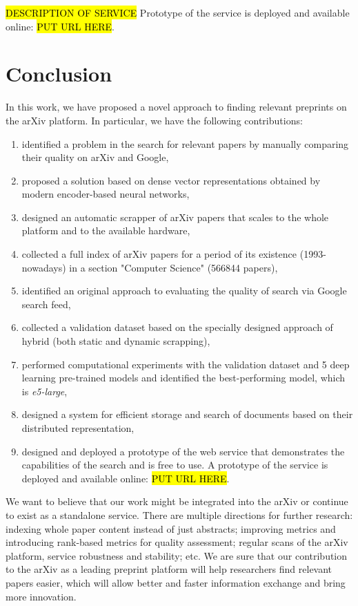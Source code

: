 \documentclass{article}
\begin{document}
        \hl{DESCRIPTION OF SERVICE} Prototype of the service is deployed and available online: \hl{PUT URL HERE}.
        
    
    \section{Conclusion}
    
        In this work, we have proposed a novel approach to finding relevant preprints on the arXiv platform. In particular, we have the following contributions:
        
        \begin{enumerate}
            \item identified a problem in the search for relevant papers by manually comparing their quality on arXiv and Google,
            \item proposed a solution based on dense vector representations obtained by modern encoder-based neural networks,
            \item designed an automatic scrapper of arXiv papers that scales to the whole platform and to the available hardware,
            \item collected a full index of arXiv papers for a period of its existence (1993-nowadays) in a section "Computer Science" (566844 papers),
            \item identified an original approach to evaluating the quality of search via Google search feed,
            \item collected a validation dataset based on the specially designed approach of hybrid (both static and dynamic scrapping),
            \item performed computational experiments with the validation dataset and 5 deep learning pre-trained models and identified the best-performing model, which is \textit{e5-large},
            \item designed a system for efficient storage and search of documents based on their distributed representation,
            \item designed and deployed a prototype of the web service that demonstrates the capabilities of the search and is free to use. A prototype of the service is deployed and available online: \hl{PUT URL HERE}.
        \end{enumerate}
        
        We want to believe that our work might be integrated into the arXiv or continue to exist as a standalone service. There are multiple directions for further research: indexing whole paper content instead of just abstracts; improving metrics and introducing rank-based metrics for quality assessment; regular scans of the arXiv platform, service robustness and stability; etc. We are sure that our contribution to the arXiv as a leading preprint platform will help researchers find relevant papers easier, which will allow better and faster information exchange and bring more innovation. 
    


\end{document}
